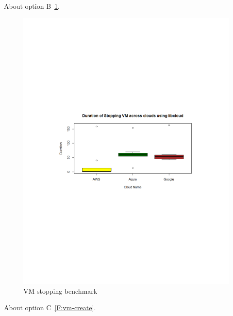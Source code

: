 About option B~\ref{F:vm-stop}.

\begin{figure}[!ht]
  \centering
  \includegraphics[width=\columnwidth]{images/StopVM.pdf}
  \caption{VM stopping benchmark}\label{F:vm-stop}
\end{figure}

About option C~\ref{F:vm-create}.

